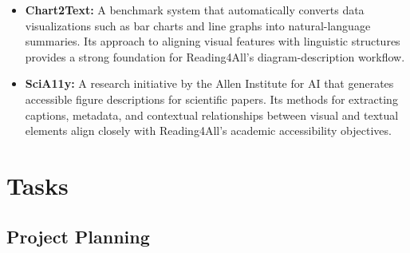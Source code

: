 \documentclass[12pt]{article}
\begin{document}
\begin{itemize}
    \item \textbf{Chart2Text:} A benchmark system that automatically converts data visualizations such as bar charts and line graphs into natural-language summaries. Its approach to aligning visual features with linguistic structures provides a strong foundation for Reading4All’s diagram-description workflow.

    \item \textbf{SciA11y:} A research initiative by the Allen Institute for AI that generates accessible figure descriptions for scientific papers. Its methods for extracting captions, metadata, and contextual relationships between visual and textual elements align closely with Reading4All’s academic accessibility objectives.
\end{itemize}
\section{Tasks}

\subsection{Project Planning}
\end{document}
